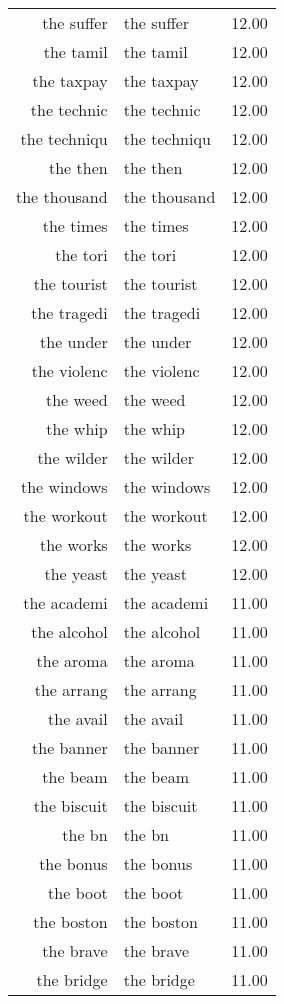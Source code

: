 \begin{table}[ht]
\begin{tabular}{rlr}
  the suffer & the suffer & 12.00 \\ 
  the tamil & the tamil & 12.00 \\ 
  the taxpay & the taxpay & 12.00 \\ 
  the technic & the technic & 12.00 \\ 
  the techniqu & the techniqu & 12.00 \\ 
  the then & the then & 12.00 \\ 
  the thousand & the thousand & 12.00 \\ 
  the times & the times & 12.00 \\ 
  the tori & the tori & 12.00 \\ 
  the tourist & the tourist & 12.00 \\ 
  the tragedi & the tragedi & 12.00 \\ 
  the under & the under & 12.00 \\ 
  the violenc & the violenc & 12.00 \\ 
  the weed & the weed & 12.00 \\ 
  the whip & the whip & 12.00 \\ 
  the wilder & the wilder & 12.00 \\ 
  the windows & the windows & 12.00 \\ 
  the workout & the workout & 12.00 \\ 
  the works & the works & 12.00 \\ 
  the yeast & the yeast & 12.00 \\ 
  the academi & the academi & 11.00 \\ 
  the alcohol & the alcohol & 11.00 \\ 
  the aroma & the aroma & 11.00 \\ 
  the arrang & the arrang & 11.00 \\ 
  the avail & the avail & 11.00 \\ 
  the banner & the banner & 11.00 \\ 
  the beam & the beam & 11.00 \\ 
  the biscuit & the biscuit & 11.00 \\ 
  the bn & the bn & 11.00 \\ 
  the bonus & the bonus & 11.00 \\ 
  the boot & the boot & 11.00 \\ 
  the boston & the boston & 11.00 \\ 
  the brave & the brave & 11.00 \\ 
  the bridge & the bridge & 11.00 \\ 

\end{tabular}
\end{table}
